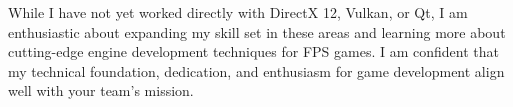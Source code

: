 While I have not yet worked directly with DirectX 12, Vulkan, or Qt, 
I am enthusiastic about expanding my skill set in these areas and 
learning more about cutting-edge engine development techniques for FPS games. 
I am confident that my technical foundation, dedication, and enthusiasm for 
game development align well with your team’s mission.